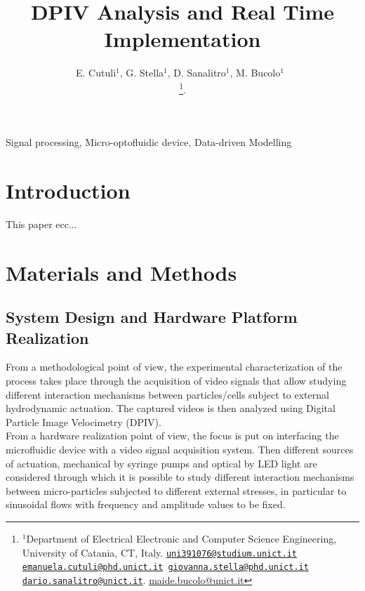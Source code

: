 \documentclass[journal]{IEEEtran}
\title{DPIV Analysis and Real Time Implementation}
\author{E. Cutuli${^{1}}$, G. Stella${^{1}}$, D. Sanalitro${^{1}}$, M. Bucolo${^{1}}$~\IEEEmembership{Senior Member,~IEEE}

\thanks{$^1$Department of Electrical Electronic and Computer Science Engineering, University of Catania, CT, Italy. {\tt \scriptsize\href{mailto:uni391076@studium.unict.it}{\mbox{uni391076@studium.unict.it}}
\scriptsize\href{mailto:emaunuela.cutuli@phd.unict.it}{\mbox{emanuela.cutuli@phd.unict.it}}
\scriptsize\href{mailto:giovanna.stella@phd.unict.it}{\mbox{giovanna.stella@phd.unict.it}}
\scriptsize\href{mailto:dario.sanalitro@unict.it}{\mbox{dario.sanalitro@unict.it}}}. 
\scriptsize\href{mailto:maide.bucolo@unict.it}{\mbox{maide.bucolo@unict.it}}}. 
}
\theoremstyle{definition}
\theoremstyle{remark}
\begin{document}


\maketitle

\begin{abstract}

\end{abstract}

\begin{IEEEkeywords}
	Signal processing, Micro-optofluidic device, Data-driven Modelling
\end{IEEEkeywords}

\section{Introduction}

This paper ecc...



\section{Materials and Methods}

\subsection{System Design and Hardware Platform Realization}\label{sec:design}

From a methodological point of view, the experimental characterization of the process takes place through the acquisition of video signals  that allow studying different interaction mechanisms between particles/cells subject to external hydrodynamic actuation.
The captured videos is then analyzed using Digital Particle Image Velocimetry (DPIV).
\\From a hardware realization point of view, the focus is put on interfacing the microfluidic device with a video signal acquisition system.
Then different sources of actuation, mechanical by syringe pumps and optical by LED light are considered through which it is possible to study different interaction mechanisms between micro-particles subjected to different external stresses, in particular to sinusoidal flows with frequency and amplitude values to be fixed. 
\end{document}
